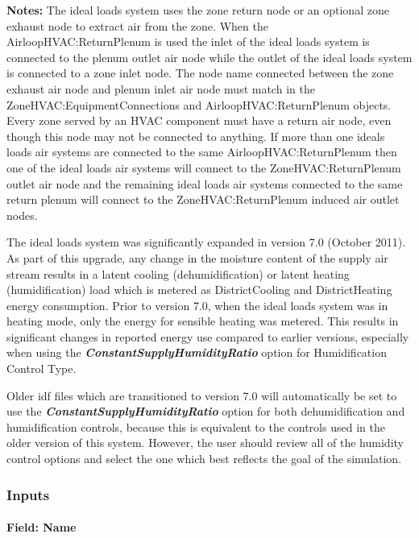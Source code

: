 \textbf{Notes:} The ideal loads system uses the zone return node or an optional zone exhaust node to extract air from the zone. When the AirloopHVAC:ReturnPlenum is used the inlet of the ideal loads system is connected to the plenum outlet air node while the outlet of the ideal loads system is connected to a zone inlet node. The node name connected between the zone exhaust air node and plenum inlet air node must match in the ZoneHVAC:EquipmentConnections and AirloopHVAC:ReturnPlenum objects. Every zone served by an HVAC component must have a return air node, even though this node may not be connected to anything. If more than one ideals loads air systems are connected to the same AirloopHVAC:ReturnPlenum then one of the ideal loads air systems will connect to the ZoneHVAC:ReturnPlenum outlet air node and the remaining ideal loads air systems connected to the same return plenum will connect to the ZoneHVAC:ReturnPlenum induced air outlet nodes.

The ideal loads system was significantly expanded in version 7.0 (October 2011). As part of this upgrade, any change in the moisture content of the supply air stream results in a latent cooling (dehumidification) or latent heating (humidification) load which is metered as DistrictCooling and DistrictHeating energy consumption. Prior to version 7.0, when the ideal loads system was in heating mode, only the energy for sensible heating was metered. This results in significant changes in reported energy use compared to earlier versions, especially when using the \textbf{\emph{ConstantSupplyHumidityRatio}} option for Humidification Control Type.

Older idf files which are transitioned to version 7.0 will automatically be set to use the \textbf{\emph{ConstantSupplyHumidityRatio}} option for both dehumidification and humidification controls, because this is equivalent to the controls used in the older version of this system. However, the user should review all of the humidity control options and select the one which best reflects the goal of the simulation.

\subsubsection{Inputs}\label{inputs-056}

\paragraph{Field: Name}\label{field-name-054}

